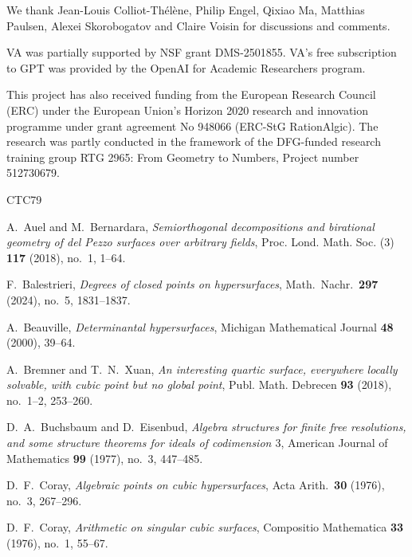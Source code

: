 \documentclass[a4paper,11pt]{amsart}
\numberwithin{equation}{section}
\theoremstyle{definition}
\theoremstyle{remark}
\begin{document}
We thank Jean-Louis Colliot-Th\'el\`ene, Philip Engel, Qixiao Ma, Matthias Paulsen, Alexei Skorobogatov and Claire Voisin for discussions and comments. 

VA was partially supported by NSF grant DMS-2501855. VA's free subscription to GPT was provided by the OpenAI for Academic Researchers program. 

This project has also received funding from the European Research Council (ERC) under the European Union’s Horizon 2020 research and innovation programme under grant agreement No 948066 (ERC-StG RationAlgic).
The research was partly conducted in the framework of the DFG-funded research training group RTG 2965: From Geometry to Numbers, Project number 512730679. 

\begin{thebibliography}{CTC79}


A.\ Auel and M.\ Bernardara,
\emph{Semiorthogonal decompositions and birational geometry
of del Pezzo surfaces over arbitrary fields},
Proc. Lond. Math. Soc. (3) \textbf{117} (2018), no.~1, 1--64.

F.\ Balestrieri,
{\em Degrees of closed points on hypersurfaces},
Math.\ Nachr.\ \textbf{297} (2024), no.\ 5, 1831--1837.

A.\ Beauville,
\emph{Determinantal hypersurfaces},
Michigan Mathematical Journal \textbf{48} (2000), 39--64.

A.\ Bremner and T.\ N.\ Xuan,
\emph{An interesting quartic surface, everywhere locally solvable, with cubic point but no global point},
Publ. Math. Debrecen \textbf{93} (2018), no.~1--2, 253--260.

D.\ A.\ Buchsbaum and D.\ Eisenbud,
\emph{Algebra structures for finite free resolutions, and some structure theorems for ideals of codimension $3$},
American Journal of Mathematics \textbf{99} (1977), no.~3, 447--485.

D.\ F.\ Coray,
{\em Algebraic points on cubic hypersurfaces},
Acta Arith.\ \textbf{30} (1976), no.\ 3, 267--296.



D.\ F.\ Coray,
\emph{Arithmetic on singular cubic surfaces},
Compositio Mathematica \textbf{33} (1976), no.~1, 55--67.


\end{thebibliography}
\end{document}
